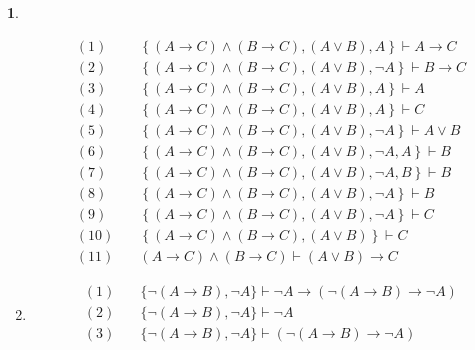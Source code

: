 \documentclass[a4paper, 12pt]{ctexbook} %
\theoremstyle{plain}
\theoremstyle{definition}
\newtheorem{problem}{}
\theoremstyle{remark}
\begin{document}
\begin{problem}
\begin{enumerate}
\begin{align*}
(1)\quad &\left\{ \left(A \to C\right) \wedge \left(B \to C\right) , \left(A  \vee B \right)  , A \right\} \vdash  A \to C \tag{$\wedge -$}\\
(2)\quad &\left\{ \left(A \to C\right) \wedge \left(B \to C\right) , \left(A  \vee B \right)  , \neg A \right\} \vdash  B \to C \tag{$\wedge -$}\\
(3)\quad &\left\{ \left(A \to C\right) \wedge \left(B \to C\right) , \left(A  \vee B \right)  , A \right\} \vdash  A \tag{$\in$} \\ 
(4)\quad &\left\{ \left(A \to C\right) \wedge \left(B \to C\right) , \left(A  \vee B \right)  , A \right\} \vdash  C \tag{$\rightarrow -$} \\ 
(5)\quad &\left\{ \left(A \to C\right) \wedge \left(B \to C\right) , \left(A  \vee B \right)  , \neg A \right\} \vdash  A \vee B \tag{$\in$} \\
(6)\quad &\left\{ \left(A \to C\right) \wedge \left(B \to C\right) , \left(A  \vee B \right)  , \neg A , A\right\} \vdash  B \tag{$\neg -$} \\
(7)\quad &\left\{ \left(A \to C\right) \wedge \left(B \to C\right) , \left(A  \vee B \right)  , \neg A , B \right\} \vdash  B \tag{$\in$} \\
(8)\quad &\left\{ \left(A \to C\right) \wedge \left(B \to C\right) , \left(A  \vee B \right)  , \neg A \right\} \vdash  B \tag{$\vee -$} \\
(9)\quad &\left\{ \left(A \to C\right) \wedge \left(B \to C\right) , \left(A  \vee B \right)  , \neg A \right\} \vdash  C \tag{(2)(8)$\to -$} \\
(10)\quad &\left\{\left(A \to C\right) \wedge \left(B \to C\right) , \left(A  \vee B \right)   \right\} \vdash  C  \tag{(4)(9) $\neg -$}\\
(11)\quad &\left(A \to C\right) \wedge \left(B \to C\right)\vdash \left(A  \vee B \right) \to C \tag{演绎}
\end{align*}
\item 
\begin{align*}
(1) \quad &\{    \neg \left(A \to B \right) ,\neg A \} \vdash \neg A \to \left(\neg \left(A \to B \right) \to \neg A \right) \tag{定理 7} \\
(2) \quad &\{\neg \left(A \to  B\right) , \neg A \} \vdash  \neg A \tag{$\in$} \\
(3) \quad &\{\neg \left(A \to B \right) , \neg  A\} \vdash  \left( \neg \left(A \to B \right) \to \neg A \right) \tag{$\to -$} \\

\end{align*}
\end{enumerate}
\end{problem}
\end{document}

